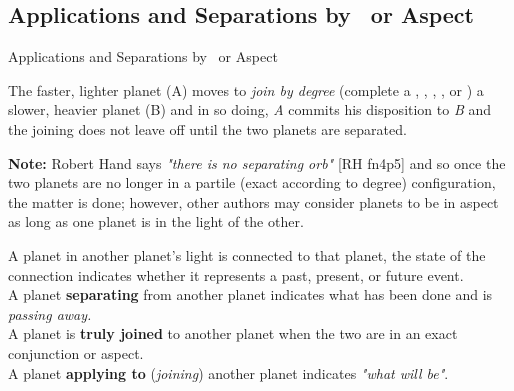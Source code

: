 \subsection{Applications and Separations by \Conjunction\ or Aspect}

\begin{frame}[t]{Applications and Separations by \Conjunction\ or Aspect}
\begin{block}{}
The faster, lighter planet (A) moves to \textsl{join by degree} (complete a \Conjunction, \Sextile, \Square, \Trine, or \Opposition) a slower, heavier planet (B) and in so doing, \textsl{A} commits his disposition to \textsl{B} and the joining does not leave off until the two planets are separated.
\end{block}

\begin{mdframed}[backgroundcolor=gray!5, rightmargin=2em, leftmargin=2em]
\small
\textbf{Note:} Robert Hand says \textsl{"there is no separating orb"} [RH fn4p5] and so once the two planets are no longer in a partile (exact according to degree) configuration, the matter is done; however, other authors may consider planets to be in aspect as long as one planet is in the light of the other.\footnotemark[1]
\end{mdframed}

A planet in another planet's light is connected to that planet, the state of the connection indicates whether it represents a past, present, or future event.\\

A planet \textbf{separating} from another planet indicates what has been done and is \textsl{passing away.}\\

A planet is \textbf{truly joined} to another planet when the two are in an exact conjunction or aspect.\\

A planet \textbf{applying to} (\textsl{joining}) another planet  indicates \textsl{"what will be"}. \\


\end{frame}